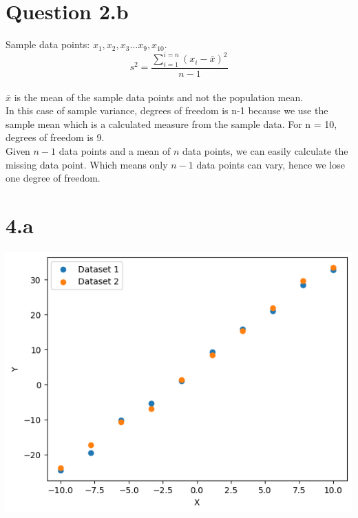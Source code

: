 \documentclass[12pt]{article}
\begin{document}
\section*{Question 2.b}
Sample data points: \(x_1, x_2, x_3 \dots x_9, x_{10}\).
\\
\[s^2 = \frac{\sum_{i=1}^{i=n}(x_i - \bar{x})^2}{n-1}\]
\\
\(\bar{x}\) is the mean of the sample data points and not the population mean.
\\[\baselineskip]
In this case of sample variance, degrees of freedom is n-1 because we use the
sample mean which is a calculated measure from the sample data.
For n = 10, degrees of freedom is 9.
\\[\baselineskip]
Given \(n-1\) data points and a mean of \(n\) data points, we can easily calculate the
missing data point. Which means only \(n-1\) data points can vary, hence we lose
one degree of freedom.

\newpage
\section*{4.a}
\includegraphics*{graph4a}
\end{document}
